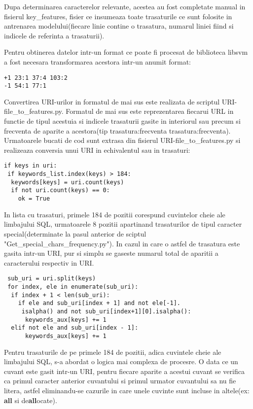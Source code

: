 Dupa determinarea caracterelor relevante, acestea au fost completate manual in fisierul key\_features, fisier ce insumeaza toate trasaturile ce sunt folosite in antrenarea modelului(fiecare linie contine o trasatura, numarul liniei fiind si indicele de referinta a trasaturii).

Pentru obtinerea datelor intr-un format ce poate fi procesat de biblioteca libsvm \cite{libsvm} a fost necesara transformarea acestora intr-un anumit format:

\begin{lstlisting}
+1 23:1 37:4 103:2
-1 54:1 77:1
\end{lstlisting}

Convertirea URI-urilor in formatul de mai sus este realizata de scriptul URI-file\_to\_features.py. Formatul de mai sus este reprezentarea fiecarui URL in functie de tipul acestuia si indicele trasaturii gasite in interiorul sau precum si frecventa de aparite a acestora(tip trasatura:frecventa trasatura:frecventa). Urmatoarele bucati de cod sunt extrasa din fisierul URI-file\_to\_features.py si realizeaza conversia unui URI in echivalentul sau in trasaturi:

\begin{lstlisting}
if keys in uri:
 if keywords_list.index(keys) > 184:
  keywords[keys] = uri.count(keys)
  if not uri.count(keys) == 0:
    ok = True
\end{lstlisting}

In lista cu trasaturi, primele 184 de pozitii corespund cuvintelor cheie ale limbajului SQL, urmatoarele 8 pozitii apartinand trasaturilor de tipul caracter special(determinate la pasul anterior de sciptul "Get\_special\_chars\_frequency.py"). In cazul in care o astfel de trasatura este gasita intr-un URI, pur si simplu se gaseste numarul total de aparitii a caracterului respectiv in URI.


\begin{lstlisting}
 sub_uri = uri.split(keys)
 for index, ele in enumerate(sub_uri):
  if index + 1 < len(sub_uri):
    if ele and sub_uri[index + 1] and not ele[-1].
     isalpha() and not sub_uri[index+1][0].isalpha():
      keywords_aux[keys] += 1
  elif not ele and sub_uri[index - 1]:
      keywords_aux[keys] += 1
\end{lstlisting}

Pentru trasaturile de pe primele 184 de pozitii, adica cuvintele cheie ale limbajului SQL, s-a abordat o logica mai complexa de procesre. O data ce un cuvant este gasit intr-un URI, pentru fiecare aparite a acestui cuvant se verifica ca primul caracter anterior cuvantului si primul urmator cuvantului sa nu fie litera, astfel eliminandu-se cazurile in care unele cuvinte sunt incluse in altele(ex: \textbf{all} si de\textbf{all}ocate).

